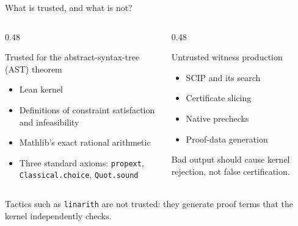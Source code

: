 \documentclass[aspectratio=169,11pt]{beamer}
\newcommand{\scip}{\textsc{SCIP}}
\newcommand{\code}[1]{\texttt{#1}}
\begin{document}
\begin{frame}{What is trusted, and what is not?}
  \begin{columns}[T]
    \begin{column}{0.48\textwidth}
      \begin{block}{Trusted for the abstract-syntax-tree (AST) theorem}
        \begin{itemize}
          \item Lean kernel
          \item Definitions of constraint satisfaction and infeasibility
          \item Mathlib's exact rational arithmetic
          \item Three standard axioms:
                \code{propext}, \code{Classical.choice}, \code{Quot.sound}
        \end{itemize}
      \end{block}
    \end{column}
    \begin{column}{0.48\textwidth}
      \begin{alertblock}{Untrusted witness production}
        \begin{itemize}
          \item \scip{} and its search
          \item Certificate slicing
          \item Native prechecks
          \item Proof-data generation
        \end{itemize}
        Bad output should cause kernel rejection, not false certification.
      \end{alertblock}
    \end{column}
  \end{columns}

  \vspace{0.5em}
  Tactics such as \code{linarith} are not trusted: they generate proof terms that
  the kernel independently checks.
\end{frame}
\end{document}
